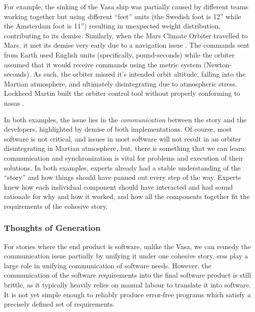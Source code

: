 For example, the sinking of the Vasa ship \cite{wiki:Vasa_ship} was partially
caused by different teams working together but using different ``feet'' units
(the Swedish foot is 12'' while the Amsterdam foot is 11'') resulting in
unexpected weight distribution, contributing to its demise. Similarly, when the
Mars Climate Orbiter travelled to Mars, it met its demise very early due to a
navigation issue \cite{Siddiqi2018}. The commands sent from Earth used English
units (specifically, pound-seconds) while the orbiter assumed that it would
receive commands using the metric system (Newton-seconds). As such, the orbiter
missed it's intended orbit altitude, falling into the Martian atmosphere, and
ultimately disintegrating due to atmospheric stress. Lockheed Martin built the
orbiter control tool without properly conforming to \acsp{nasa} .

In both examples, the issue lies in the \textit{communication} between the story
and the developers, highlighted by demise of both implementations. Of course,
most software is not critical, and issues in most software will not result in an
orbiter disintegrating in Martian atmosphere, but, there is something that we
can learn: communication and synchronization is vital for problems and execution
of their solutions. In both examples, experts already had a stable understanding
of the ``story'' and how things should have panned out every step of the way.
Experts knew how each individual component should have interacted and had sound
rationale for why and how it worked, and how all the components together fit the
requirements of the cohesive story.

\subsubsection{Thoughts of Generation}

For stories where the end product is software, unlike the Vasa, we can remedy
the communication issue partially by unifying it under one cohesive story.
\Aclp{srs} play a large role in unifying communication of software needs.
However, the communication of the software requirements into the final software
product is still brittle, as it typically heavily relies on manual labour to
translate it into software. It is not yet simple enough to reliably produce
error-free programs which satisfy a precisely defined set of requirements.

